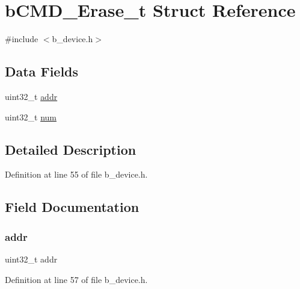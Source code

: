 \hypertarget{structb_c_m_d___erase__t}{}\section{b\+C\+M\+D\+\_\+\+Erase\+\_\+t Struct Reference}
\label{structb_c_m_d___erase__t}


{\ttfamily \#include $<$b\+\_\+device.\+h$>$}

\subsection*{Data Fields}
\begin{DoxyCompactItemize}
\item 
uint32\+\_\+t \mbox{\hyperlink{structb_c_m_d___erase__t_ab439e3a90339e2e8ca8f82d4557a34e5}{addr}}
\item 
uint32\+\_\+t \mbox{\hyperlink{structb_c_m_d___erase__t_a7beea8f6745c478347f244cadef771c2}{num}}
\end{DoxyCompactItemize}


\subsection{Detailed Description}


Definition at line 55 of file b\+\_\+device.\+h.



\subsection{Field Documentation}
\mbox{\label{structb_c_m_d___erase__t_ab439e3a90339e2e8ca8f82d4557a34e5}} 
\subsubsection{\texorpdfstring{addr}{addr}}
{\footnotesize\ttfamily uint32\+\_\+t addr}



Definition at line 57 of file b\+\_\+device.\+h.

\mbox{\label{structb_c_m_d___erase__t_a7beea8f6745c478347f244cadef771c2}} 

